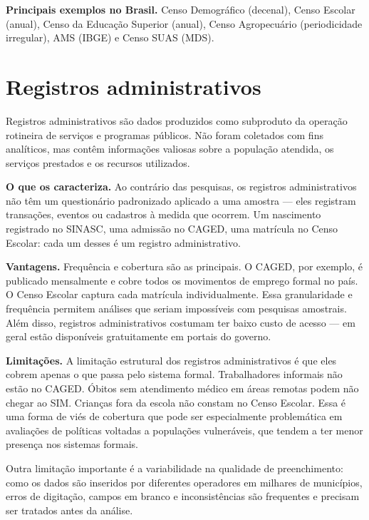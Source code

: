 \textbf{Principais exemplos no Brasil.} Censo Demográfico (decenal), Censo Escolar (anual), Censo da Educação Superior (anual), Censo Agropecuário (periodicidade irregular), AMS (IBGE) e Censo SUAS (MDS).

\section{Registros administrativos}

Registros administrativos são dados produzidos como subproduto da operação rotineira de serviços e programas públicos. Não foram coletados com fins analíticos, mas contêm informações valiosas sobre a população atendida, os serviços prestados e os recursos utilizados.

\textbf{O que os caracteriza.} Ao contrário das pesquisas, os registros administrativos não têm um questionário padronizado aplicado a uma amostra — eles registram transações, eventos ou cadastros à medida que ocorrem. Um nascimento registrado no SINASC, uma admissão no CAGED, uma matrícula no Censo Escolar: cada um desses é um registro administrativo.

\textbf{Vantagens.} Frequência e cobertura são as principais. O CAGED, por exemplo, é publicado mensalmente e cobre todos os movimentos de emprego formal no país. O Censo Escolar captura cada matrícula individualmente. Essa granularidade e frequência permitem análises que seriam impossíveis com pesquisas amostrais. Além disso, registros administrativos costumam ter baixo custo de acesso — em geral estão disponíveis gratuitamente em portais do governo.

\textbf{Limitações.} A limitação estrutural dos registros administrativos é que eles cobrem apenas o que passa pelo sistema formal. Trabalhadores informais não estão no CAGED. Óbitos sem atendimento médico em áreas remotas podem não chegar ao SIM. Crianças fora da escola não constam no Censo Escolar. Essa é uma forma de viés de cobertura que pode ser especialmente problemática em avaliações de políticas voltadas a populações vulneráveis, que tendem a ter menor presença nos sistemas formais.

Outra limitação importante é a variabilidade na qualidade de preenchimento: como os dados são inseridos por diferentes operadores em milhares de municípios, erros de digitação, campos em branco e inconsistências são frequentes e precisam ser tratados antes da análise.

